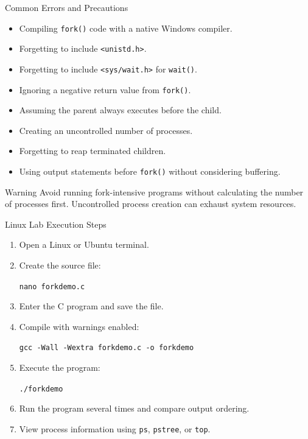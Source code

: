 \documentclass[aspectratio=169]{beamer}
\begin{document}
\begin{frame}{Common Errors and Precautions}

\begin{itemize}
    \item Compiling \texttt{fork()} code with a native Windows compiler.
    \item Forgetting to include \texttt{<unistd.h>}.
    \item Forgetting to include \texttt{<sys/wait.h>} for \texttt{wait()}.
    \item Ignoring a negative return value from \texttt{fork()}.
    \item Assuming the parent always executes before the child.
    \item Creating an uncontrolled number of processes.
    \item Forgetting to reap terminated children.
    \item Using output statements before \texttt{fork()} without considering
    buffering.
\end{itemize}

\begin{alertblock}{Warning}
Avoid running fork-intensive programs without calculating the number of processes
first. Uncontrolled process creation can exhaust system resources.
\end{alertblock}

\end{frame}

\begin{frame}{Linux Lab Execution Steps}

\begin{enumerate}
    \item Open a Linux or Ubuntu terminal.
    \item Create the source file:
    \begin{center}
        \texttt{nano forkdemo.c}
    \end{center}
    \item Enter the C program and save the file.
    \item Compile with warnings enabled:
    \begin{center}
        \texttt{gcc -Wall -Wextra forkdemo.c -o forkdemo}
    \end{center}
    \item Execute the program:
    \begin{center}
        \texttt{./forkdemo}
    \end{center}
    \item Run the program several times and compare output ordering.
    \item View process information using \texttt{ps}, \texttt{pstree}, or
    \texttt{top}.
\end{enumerate}

\end{frame}
\end{document}

